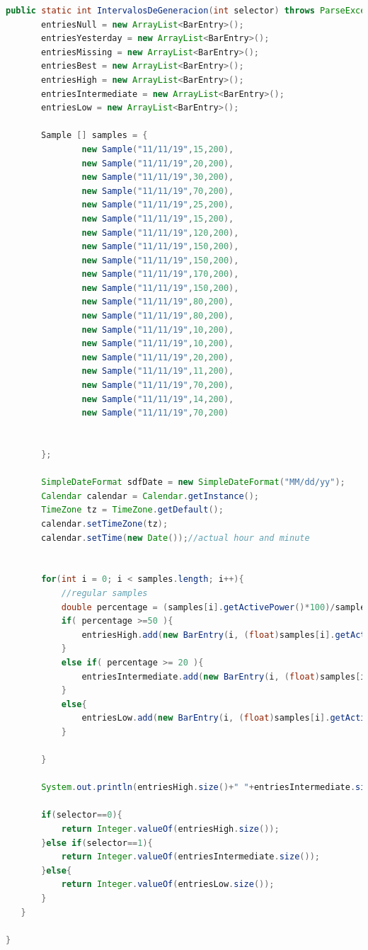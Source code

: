 \begin{lstlisting}[language= Java, frame=single]
   public static int IntervalosDeGeneracion(int selector) throws ParseException {
       entriesNull = new ArrayList<BarEntry>();
       entriesYesterday = new ArrayList<BarEntry>();
       entriesMissing = new ArrayList<BarEntry>();
       entriesBest = new ArrayList<BarEntry>();
       entriesHigh = new ArrayList<BarEntry>();
       entriesIntermediate = new ArrayList<BarEntry>();
       entriesLow = new ArrayList<BarEntry>();

       Sample [] samples = {
               new Sample("11/11/19",15,200),
               new Sample("11/11/19",20,200),
               new Sample("11/11/19",30,200),
               new Sample("11/11/19",70,200),
               new Sample("11/11/19",25,200),
               new Sample("11/11/19",15,200),
               new Sample("11/11/19",120,200),
               new Sample("11/11/19",150,200),
               new Sample("11/11/19",150,200),
               new Sample("11/11/19",170,200),
               new Sample("11/11/19",150,200),
               new Sample("11/11/19",80,200),
               new Sample("11/11/19",80,200),
               new Sample("11/11/19",10,200),
               new Sample("11/11/19",10,200),
               new Sample("11/11/19",20,200),
               new Sample("11/11/19",11,200),
               new Sample("11/11/19",70,200),
               new Sample("11/11/19",14,200),
               new Sample("11/11/19",70,200)


       };

       SimpleDateFormat sdfDate = new SimpleDateFormat("MM/dd/yy");
       Calendar calendar = Calendar.getInstance();
       TimeZone tz = TimeZone.getDefault();
       calendar.setTimeZone(tz);
       calendar.setTime(new Date());//actual hour and minute


       for(int i = 0; i < samples.length; i++){
           //regular samples
           double percentage = (samples[i].getActivePower()*100)/samples[i].getMaxGeneration();
           if( percentage >=50 ){
               entriesHigh.add(new BarEntry(i, (float)samples[i].getActivePower()));
           }
           else if( percentage >= 20 ){
               entriesIntermediate.add(new BarEntry(i, (float)samples[i].getActivePower()));
           }
           else{
               entriesLow.add(new BarEntry(i, (float)samples[i].getActivePower()));
           }

       }

       System.out.println(entriesHigh.size()+" "+entriesIntermediate.size()+" "+entriesLow.size());

       if(selector==0){
           return Integer.valueOf(entriesHigh.size());
       }else if(selector==1){
           return Integer.valueOf(entriesIntermediate.size());
       }else{
           return Integer.valueOf(entriesLow.size());
       }
   }

}

\end{lstlisting}

